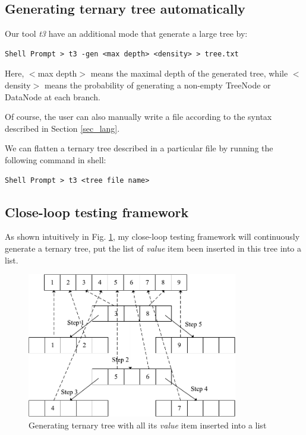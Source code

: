 \documentclass[runningheads,a4paper]{llncs}
\begin{document}
\subsection{Generating ternary tree automatically}
Our tool \emph{t3} have an additional mode that generate a large tree by:


\begin{lstlisting}
Shell Prompt > t3 -gen <max depth> <density> > tree.txt
\end{lstlisting}

Here,
$<$max depth$>$ means the maximal depth of the generated tree,
while $<$density$>$ means the probability of generating a non-empty TreeNode or DataNode
at each branch.

Of course,
the user can also manually write a file according to the 
syntax described in Section \ref{sec_lang}.

We can flatten a ternary tree described in a particular file 
by running the following command in shell:
\begin{lstlisting}
Shell Prompt > t3 <tree file name>
\end{lstlisting}

\subsection{Close-loop testing framework}

As shown intuitively in Fig. \ref{fig_closeloop},
my close-loop testing framework will continuously generate a ternary tree,
put the list of \emph{value} item been inserted in this tree into a list.



\begin{figure}
\centering
\includegraphics[width=9.2cm]{fig_closeloop}
\caption{Generating ternary tree with all its \emph{value} item inserted into a list}
\label{fig_closeloop}
\end{figure}
\end{document}
